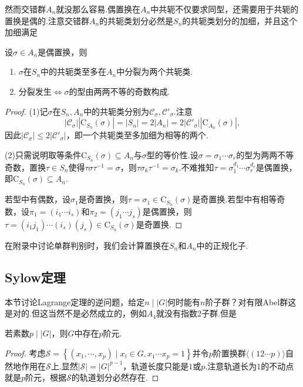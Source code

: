 然而交错群$A_n$就没那么容易.偶置换在$A_n$中共轭不仅要求同型，还需要用于共轭的置换是偶的.注意交错群$A_n$的共轭类划分必然是$S_n$的共轭类划分的加细，并且这个加细满足
\begin{prop}
	设$\sigma\in A_n$是偶置换，则
	\begin{enumerate}
		\item $\sigma$在$S_n$中的共轭类至多在$A_n$中分裂为两个共轭类.
		\item 分裂发生$\iff$$\sigma$的型由两两不等的奇数构成.
	\end{enumerate}
\end{prop}
\begin{proof}
	\hspace*{5.4pt}(1)记$\sigma$在$S_n,A_n$中的共轭类分别为$\mathcal{C}_\sigma,\mathcal{C}'_\sigma$.注意
	\[
		|\mathcal{C}_\sigma||\mathrm{C}_{S_n}(\sigma)|=|S_n|=2|A_n|=2|\mathcal{C}'_\sigma||\mathrm{C}_{A_n}(\sigma)|,
	\]
	因此$|\mathcal{C}_\sigma|\le 2|\mathcal{C}'_{\sigma}|$，即一个共轭类至多加细为相等的两个.
	
	(2)只需说明取等条件$\mathrm{C}_{S_n}(\sigma)\subseteq A_n$与$\sigma$型的等价性.设$\sigma=\sigma_1\cdots\sigma_r$的型为两两不等奇数，置换$\tau\in S_n$使得$\tau\sigma\tau^{-1}=\sigma$，则$\tau\sigma_k\tau^{-1}=\sigma_k$.不难推知$\tau=\sigma_1^{d_1}\cdots\sigma_r^{d_r}$是偶置换，即$\mathrm{C}_{S_n}(\sigma)\subseteq A_n$.
	
	若型中有偶数，设$\sigma_1$是奇置换，则$\tau=\sigma_1\in\mathrm{C}_{S_n}(\sigma)$是奇置换.若型中有相等奇数，设$\pi_1=(i_1\cdots i_s)$和$\pi_2=(j_1\cdots j_s)$是偶置换，则$\tau=(i_1j_1)\cdots(i_s)(j_s)\in\mathrm{C}_{S_n}(\sigma)$是奇置换.
\end{proof}
\begin{remark}
	在附录中讨论单群判别时，我们会计算置换在$S_n$和$A_n$中的正规化子.%
\end{remark}
\subsection{Sylow定理}
本节讨论Lagrange定理的逆问题，给定$n\mid |G|$何时能有$n$阶子群？对有限Abel群这是对的.但这当然不是必然成立的，例如$A_4$就没有指数2子群.但是
\begin{thm}[(Cauchy)]
	若素数$p\mid|G|$，则$G$中存在$p$阶元.\hypertarget{thm:Cauchy}{}
\end{thm}
\begin{proof}
	考虑$\mathcal{S}=\left\{(x_1,\cdots,x_p)\mid x_i\in G,x_1\cdots x_p=1\right\}$并令$p$阶置换群$\langle (12\cdots p)\rangle $自然地作用在$\mathcal{S}$上.显然$|\mathcal{S}|=|G|^{p-1}$，轨道长度只能是$1$或$p$.注意轨道长为$1$的不动点就是$p$阶元，根据$\mathcal{S}$的轨道划分必然存在.
\end{proof}

